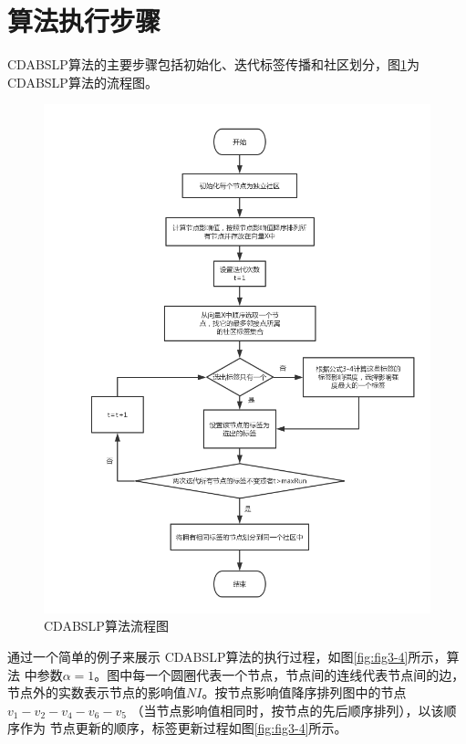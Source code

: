\section{算法执行步骤}
CDABSLP算法的主要步骤包括初始化、迭代标签传播和社区划分，图\ref{fig:fig3-3}为
CDABSLP算法的流程图。

\begin{figure}
  \centering
  \includegraphics[width=1\textwidth]{figures/fig3-3}
  \caption{CDABSLP算法流程图}\label{fig:fig3-3}
 \end{figure}

通过一个简单的例子来展示 CDABSLP算法的执行过程，如图\ref{fig:fig3-4}所示，算法
中参数$\alpha =1$。图中每一个圆圈代表一个节点，节点间的连线代表节点间的边，
节点外的实数表示节点的影响值$ NI$。按节点影响值降序排列图中的节点$v_1-v_2-v_4-v_6-v_5$
（当节点影响值相同时，按节点的先后顺序排列），以该顺序作为
节点更新的顺序，标签更新过程如图\ref{fig:fig3-4}所示。

